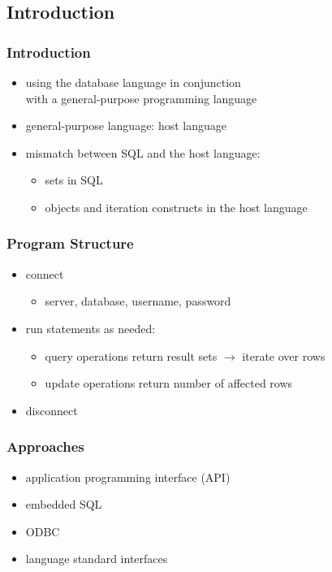 \documentclass[dvipsnames]{beamer}
\theoremstyle{plain}
\begin{document}
\subsection{Introduction}

\lstset{language=C}

\begin{frame}
  \frametitle{Introduction}

  \begin{itemize}
    \item using the database language in conjunction\\
      with a general-purpose programming language
    \item general-purpose language: \alert{host language}

    \pause
    \bigskip
    \item mismatch between SQL and the host language:
    \begin{itemize}
      \item sets in SQL
      \item objects and iteration constructs in the host language
    \end{itemize}
  \end{itemize}
\end{frame}

\begin{frame}
  \frametitle{Program Structure}

  \begin{itemize}
    \item connect
    \begin{itemize}
      \item server, database, username, password
    \end{itemize}

    \pause
    \medskip
    \item run statements as needed:
    \begin{itemize}
      \item query operations return result sets $\rightarrow$ iterate over rows
      \item update operations return number of affected rows
    \end{itemize}

    \pause
    \medskip
    \item disconnect
  \end{itemize}
\end{frame}

\begin{frame}
  \frametitle{Approaches}

  \begin{itemize}
    \item application programming interface (API)
    \item embedded SQL
    \item ODBC
    \item language standard interfaces
  \end{itemize}
\end{frame}
\end{document}
